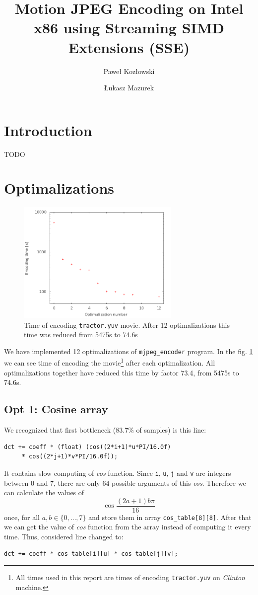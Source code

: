 \documentclass[11pt]{article}
\title{Motion JPEG Encoding on Intel x86 using Streaming SIMD Extensions (SSE)}
\author{Paweł Kozłowski \and Łukasz Mazurek}
\begin{document}
\maketitle

\section{Introduction}
TODO

\section{Optimalizations}

\begin{figure}[h]
	\centering
	\includegraphics[width=0.7\textwidth]{img/times.png}
	\caption{Time of encoding \texttt{tractor.yuv} movie. After 12 optimalizations this time was reduced from 5475s to 74.6s}
	\label{times_plot}
\end{figure}

We have implemented 12 optimalizations of \texttt{mjpeg\_encoder} program.
In the fig. \ref{times_plot} we can see time of encoding the movie\footnote{All times used in this report are times of encoding \texttt{tractor.yuv} on \emph{Clinton} machine.} after each optimalization.
All optimalizations together have reduced this time by factor 73.4, from 5475s to 74.6s. 

\subsection{Opt 1: Cosine array}
We recognized that first bottleneck (83.7\% of samples) is this line:

\begin{lstlisting}
dct += coeff * (float) (cos((2*i+1)*u*PI/16.0f) 
     * cos((2*j+1)*v*PI/16.0f));
\end{lstlisting}
It contains slow computing of \emph{cos} function.
Since \texttt{i}, \texttt{u}, \texttt{j} and \texttt{v} are integers between 0 and 7, there are only 64 possible arguments of this \emph{cos}.
Therefore we can calculate the values of 
$$\cos \frac{(2a + 1) b \pi}{16}$$
once, for all $a, b \in \{0, \ldots, 7 \}$ and store them in array \texttt{cos\_table[8][8]}.
After that we can get the value of \emph{cos} function from the array instead of computing it every time.
Thus, considered line changed to:
\begin{lstlisting}
dct += coeff * cos_table[i][u] * cos_table[j][v];
\end{lstlisting}
\end{document}
